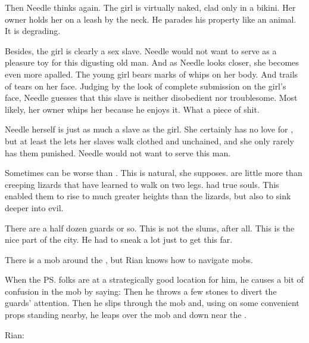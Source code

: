 Then Needle thinks again. 
The girl is virtually naked, clad only in a bikini. 
Her owner holds her on a leash by the neck. 
He parades his property like an animal. 
It is degrading. 

Besides, the girl is clearly a sex slave. 
Needle would not want to serve as a pleasure toy for this digusting old man. 
And as Needle looks closer, she becomes even more apalled. 
The young girl bears marks of whips on her body. 
And trails of tears on her face. 
Judging by the look of complete submission on the girl's face, Needle guesses that this slave is neither disobedient nor troublesome. 
Most likely, her owner whips her because he enjoys it. 
What a piece of shit. 

Needle herself is just as much a slave as the \sheomir girl. 
She certainly has no love for \Tiroco, but at least the \rinyuth lets her slaves walk clothed and unchained, and she only rarely has them punished. 
Needle would not want to serve this man. 

Sometimes \humans can be worse than \scathae. 
This is natural, she supposes.
\Scathae are little more than creeping lizards that have learned to walk on two legs. 
\Humans had true souls.
This enabled them to rise to much greater heights than the lizards, but also to sink deeper into evil. 





\begin{comment}
  \section{Rian talks to \Tiroco}
\end{comment}
\new 
There are a half dozen guards or so. 
This is not the slums, after all.
This is the nice part of the city. 
He had to sneak a lot just to get this far. 


There is a mob around the \rinyuth, but Rian knows how to navigate mobs. 

When the \ps{\rinyuth} folks are at a strategically good location for him, he causes a bit of confusion in the mob by saying: 
Then he throws a few stones to divert the guards' attention. 
Then he slips through the mob and, using on some convenient props standing nearby, he leaps over the mob and down near the \rinyuth. 

Rian:

